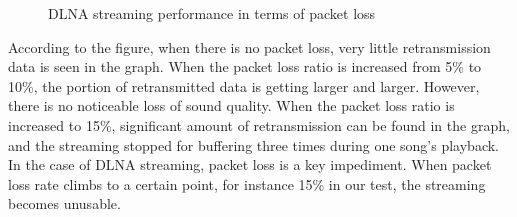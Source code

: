 \begin{figure}[hb]
\caption{DLNA streaming performance in terms of packet loss \label{dlna_pl_1}}
\end{figure}
According to the figure, when there is no packet loss, very little retransmission data is seen in the graph. When the packet loss ratio is increased from 5\% to 10\%, the portion of retransmitted data is getting larger and larger. However, there is no noticeable loss of sound quality. When the packet loss ratio is increased to 15\%, significant amount of retransmission can be found in the graph, and the streaming stopped for buffering three times during one song's playback. In the case of DLNA streaming, packet loss is a key impediment. When packet loss rate climbs to a certain point, for instance 15\% in our test, the streaming becomes unusable.\\

